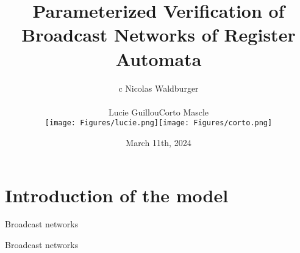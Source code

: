 \documentclass{beamer}
\begin{document}
	\title[Parameterized Verification of BNRA]{Parameterized Verification of Broadcast Networks of Register Automata}
	\date[]{March 11th, 2024\vspace{-0.5cm}}
	\author[Nicolas Waldburger]{\begin{tabular}{c} Nicolas Waldburger \\
		 \begin{tabular}{ccc}
		Lucie Guillou & Corto Mascle \\
		\texttt{[image: Figures/lucie.png]} & \texttt{[image: Figures/corto.png]} 	\end{tabular} \end{tabular} \vspace{-0.3cm}}
%	
%	
\begin{frame}
	\titlepage
\end{frame}	

\begin{frame}
	\tableofcontents
\end{frame}

\section{Introduction of the model}


\begin{frame}{Broadcast networks}
	\centering
	
\end{frame}


\begin{frame}{Broadcast networks}
	\centering
	
\end{frame}
\end{document}
